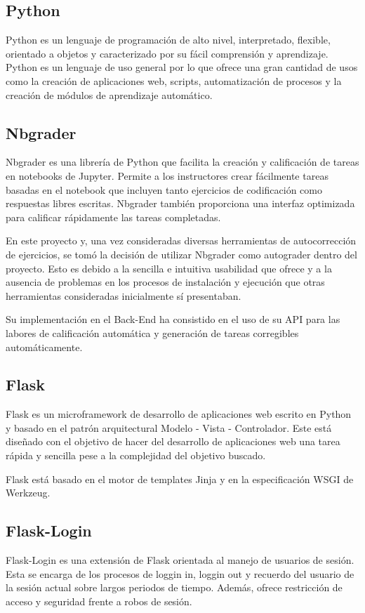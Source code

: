 \subsection{Python}
Python\cite{tool:Python} es un lenguaje de programación de alto nivel, interpretado, flexible, orientado a objetos y caracterizado por su fácil comprensión y aprendizaje. Python es un lenguaje de uso general por lo que ofrece una gran cantidad de usos como la creación de aplicaciones web, scripts, automatización de procesos y la creación de módulos de aprendizaje automático.

\subsection{Nbgrader}
Nbgrader\cite{tool:Nbgrader} es una librería de Python que facilita la creación y calificación de tareas en notebooks de Jupyter. Permite a los instructores crear fácilmente tareas basadas en el notebook que incluyen tanto ejercicios de codificación como respuestas libres escritas. Nbgrader también proporciona una interfaz optimizada para calificar rápidamente las tareas completadas.

En este proyecto y, una vez consideradas diversas herramientas de autocorrección de ejercicios, se tomó la decisión de utilizar Nbgrader como autograder dentro del proyecto. Esto es debido a la sencilla e intuitiva usabilidad que ofrece y a la ausencia de problemas en los procesos de instalación y ejecución que otras herramientas consideradas inicialmente sí presentaban.

Su implementación en el Back-End ha consistido en el uso de su API para las labores de calificación automática y generación de tareas corregibles automáticamente.

\subsection{Flask}
Flask\cite{tool:Flask} es un microframework de desarrollo de aplicaciones web escrito en Python y basado en el patrón arquitectural Modelo - Vista - Controlador. Este está diseñado con el objetivo de hacer del desarrollo de aplicaciones web una tarea rápida y sencilla pese a la complejidad del objetivo buscado.

Flask está basado en el motor de templates Jinja y en la especificación WSGI de Werkzeug.


\subsection{Flask-Login}
Flask-Login\cite{tool:FlaskLogin} es una extensión de Flask orientada al manejo de usuarios de sesión. Esta se encarga de los procesos de loggin in, loggin out y recuerdo del usuario de la sesión actual sobre largos periodos de tiempo. Además, ofrece restricción de acceso y seguridad frente a robos de sesión.

